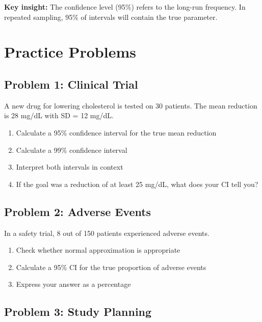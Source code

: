 \documentclass[11pt]{article}
\begin{document}
\textbf{Key insight:} The confidence level (95\%) refers to the long-run frequency. In repeated sampling, 95\% of intervals will contain the true parameter.

\section{Practice Problems}

\subsection{Problem 1: Clinical Trial}

A new drug for lowering cholesterol is tested on 30 patients. The mean reduction is 28 mg/dL with SD = 12 mg/dL.

\begin{enumerate}[label=\alph*)]
\item Calculate a 95\% confidence interval for the true mean reduction
\item Calculate a 99\% confidence interval
\item Interpret both intervals in context
\item If the goal was a reduction of at least 25 mg/dL, what does your CI tell you?
\end{enumerate}

\vspace{3cm}

\subsection{Problem 2: Adverse Events}

In a safety trial, 8 out of 150 patients experienced adverse events.

\begin{enumerate}[label=\alph*)]
\item Check whether normal approximation is appropriate
\item Calculate a 95\% CI for the true proportion of adverse events
\item Express your answer as a percentage
\end{enumerate}

\vspace{3cm}

\subsection{Problem 3: Study Planning}
\end{document}
